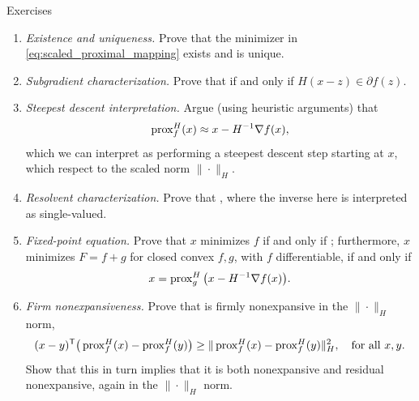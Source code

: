 \begin{xcb}{Exercises}
\begin{enumerate}[label=\thechapter.\arabic*]
\begin{enumerate}[label=\alph*.]
\item \emph{Existence and uniqueness.} Prove that the minimizer in
  \eqref{eq:scaled_proximal_mapping} exists and is unique.

\item \emph{Subgradient characterization.} Prove that 
  if and only if $H(x - z) \in \partial f(z)$. 

\item \emph{Steepest descent interpretation.} Argue (using heuristic arguments)
  that 
  \[
  \operatorname{prox}_f^H(x) \approx x - H^{-1} \nabla f(x),
  \] 
  which we can interpret as performing a steepest descent step starting at $x$,
  which respect to the scaled norm $\|\cdot\|_H$. 

\item \emph{Resolvent characterization.} Prove that , where the inverse here is interpreted as
  single-valued.   

\item \emph{Fixed-point equation.} Prove that $x$ minimizes $f$ if and only if
  ; furthermore, $x$ minimizes $F = f+g$ for closed
  convex $f,g$, with $f$ differentiable, if and only if    
  \[
  x = \operatorname{prox}_g^H \big( x - H^{-1} \nabla f(x) \big).
  \]

\item \emph{Firm nonexpansiveness.} Prove that  is firmly
  nonexpansive in the $\|\cdot\|_H$ norm, 
  \[
  (x - y)^{\mathsf{T}} \big( \operatorname{prox}_f^H(x) - \operatorname{prox}_f^H(y) \big) \geq 
  \| \operatorname{prox}_f^H(x) - \operatorname{prox}_f^H(y) \|_H^2, \quad \text{for all $x,y$}.   
  \]
  Show that this in turn implies that it is both nonexpansive and residual
  nonexpansive, again in the $\|\cdot\|_H$ norm.
\end{enumerate}
\end{enumerate}
\end{xcb}